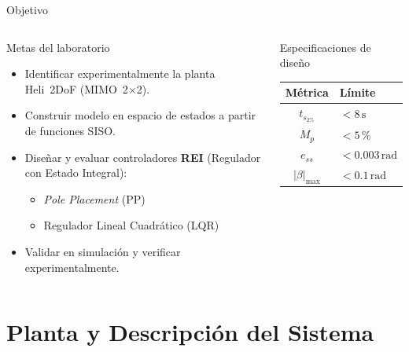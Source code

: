 \documentclass[mathserif,spanish,10pt]{beamer}
\begin{document}
\begin{frame}{Objetivo}
\begin{columns}[T]
  \begin{block}{Metas del laboratorio}
    \begin{itemize}
      \item Identificar experimentalmente la planta Heli~2DoF (MIMO~2$\times$2).
      \item Construir modelo en espacio de estados a partir de funciones SISO.
      \item Diseñar y evaluar controladores \textbf{REI} (Regulador con Estado Integral):
        \begin{itemize}
          \item \textit{Pole Placement} (PP)
          \item Regulador Lineal Cuadrático (LQR)
        \end{itemize}
      \item Validar en simulación y verificar experimentalmente.
    \end{itemize}
  \end{block}

  \begin{block}{Especificaciones de diseño}
    \vspace{0.2cm}
    \centering\small
    \begin{tabular}{cl}
      \hline
      \rowcolor{rowhdr}
      \color{white}\textbf{Métrica} & \color{white}\textbf{Límite} \\
      \hline
      $t_{s_{2\%}}$ & $< 8\,\text{s}$ \\[3pt]
      $M_p$         & $< 5\,\%$ \\[3pt]
      $e_{ss}$      & $< 0.003\,\text{rad}$ \\[3pt]
      $|\beta|_{\max}$ & $< 0.1\,\text{rad}$ \\
      \hline
    \end{tabular}
  \end{block}
\end{columns}
\end{frame}

\section{Planta y Descripción del Sistema}
\end{document}
